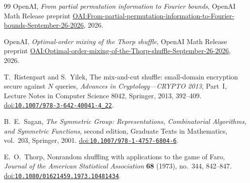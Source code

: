 \begin{thebibliography}{99}
OpenAI,
\emph{From partial permutation information to Fourier bounds},
OpenAI Math Release preprint
\href{https://github.com/openai/math/blob/main/preprints/From-partial-permutation-information-to-Fourier-bounds-September-26-2026/main.pdf}{OAI:From-partial-permutation-information-to-Fourier-bounds-September-26-2026},
2026.

OpenAI,
\emph{Optimal-order mixing of the Thorp shuffle},
OpenAI Math Release preprint
\href{https://github.com/openai/math/blob/main/preprints/Optimal-order-mixing-of-the-Thorp-shuffle-September-26-2026/paper.pdf}{OAI:Optimal-order-mixing-of-the-Thorp-shuffle-September-26-2026},
2026.

T.~Ristenpart and S.~Yilek,
The mix-and-cut shuffle: small-domain encryption secure against $N$ queries,
\emph{Advances in Cryptology---CRYPTO 2013}, Part~I,
Lecture Notes in Computer Science 8042, Springer, 2013, 392--409.
\href{https://doi.org/10.1007/978-3-642-40041-4_22}{doi:\nolinkurl{10.1007/978-3-642-40041-4_22}}.

B.~E.~Sagan,
\emph{The Symmetric Group: Representations, Combinatorial Algorithms,
and Symmetric Functions}, second edition,
Graduate Texts in Mathematics, vol.~203, Springer, 2001.
\href{https://doi.org/10.1007/978-1-4757-6804-6}{doi:\nolinkurl{10.1007/978-1-4757-6804-6}}.

E.~O.~Thorp,
Nonrandom shuffling with applications to the game of Faro,
\emph{Journal of the American Statistical Association} \textbf{68}
(1973), no.~344, 842--847.
\href{https://doi.org/10.1080/01621459.1973.10481434}{doi:\nolinkurl{10.1080/01621459.1973.10481434}}.

\end{thebibliography}
\endgroup
